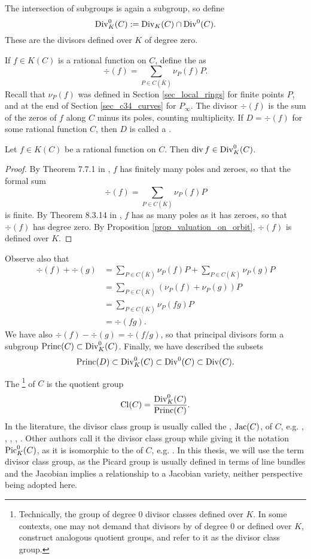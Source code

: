 The intersection of subgroups is again a subgroup, so define
  \[ \operatorname{Div}_K^0(C) := \operatorname{Div}_K(C) \cap \operatorname{Div}^0(C). \]
These are the divisors defined over $K$ of degree zero.

If $f \in K(C)$ is a rational function on $C$,
define the  as
\[ \div(f) = \sum_{P \in C(\bar K)} \nu_P(f) P. \]
Recall that $\nu_P(f)$ was defined in Section \ref{sec_local_rings} for finite points $P$,
and at the end of Section \ref{sec_c34_curves} for $P_\infty$.
The divisor $\div(f)$ is the sum of the zeros of $f$ along $C$ minus its poles, counting multiplicity.
If $D = \div(f)$ for some rational function $C$,
then $D$ is called a .
\begin{proposition}
  Let $f \in K(C)$ be a rational function on $C$.
  Then $\operatorname{div} f \in \operatorname{Div}_K^0(C)$.
\end{proposition}
\begin{proof}
  By Theorem 7.7.1 in \cite{galbraith12}, $f$ has finitely many poles and zeroes, so that the formal sum
  \[ \div(f) = \sum_{P \in C(\bar K)} \nu_P(f) P \]
  is finite.
  By Theorem 8.3.14 in \cite{galbraith12}, $f$ has as many poles as it has zeroes, so that $\div(f)$ has degree zero.
  By Proposition \ref{prop_valuation_on_orbit}, $\div(f)$ is defined over $K$.
\end{proof}
Observe also that
\begin{align*}
  \div(f) + \div(g)
    &= \sum_{P \in C(\bar K)} \nu_P(f) P + \sum_{P \in C(\bar K)} \nu_P(g) P \\
    &= \sum_{P \in C(\bar K)} (\nu_P(f) + \nu_P(g))P \\
    &= \sum_{P \in C(\bar K)} \nu_P(fg)P \\
    &= \div(fg).
\end{align*}
We have also $\div(f) - \div(g) = \div(f/g)$,
so that principal divisors form a subgroup $\operatorname{Princ}(C) \subset \operatorname{Div}_K^0(C)$.
Finally, we have described the subsets
\[ \operatorname{Princ}(D) \subset \operatorname{Div}_K^0(C) \subset \operatorname{Div}^0(C) \subset \operatorname{Div}(C). \]

The \footnote{
Technically, the group of degree 0 divisor classes defined over $K$.
In some contexts, one may not demand that divisors by of degree 0 or defined over $K$,
construct analogous quotient groups, and refer to it as the divisor class group.}
of $C$ is the quotient group
\[ \operatorname{Cl}(C) = \frac {\operatorname{Div}_K^0(C)} {\operatorname{Princ}(C)}. \]
In the literature, the divisor class group is usually called the , $\operatorname{Jac}(C)$, of $C$,
e.g. \cite{arita05-2}, \cite{basiri04}, \cite{flon08}, \cite{harasawa00}, \cite{salem07}.
Other authors call it the divisor class group while giving it the notation $\operatorname{Pic}_K^0(C)$,
as it is isomorphic to the  of $C$,
e.g. \cite{eisenbud95} \cite{galbraith12} \cite{sutherland16}.
In this thesis, we will use the term divisor class group,
as the Picard group is usually defined in terms of line bundles
and the Jacobian implies a relationship to a Jacobian variety,
neither perspective being adopted here.

